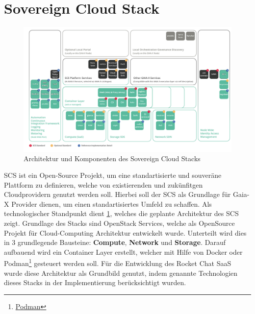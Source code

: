 \section{Sovereign Cloud Stack}
\label{sec:gaia-x:scs}

\begin{figure}[h]
  \centering
  \includegraphics[height=0.71\textwidth]{gfx/chapters/4_gaia-X/scs_architecture.png}
  \caption{Architektur und Komponenten des Sovereign Cloud Stacks}
  \label{fig:scs_architecture}
\end{figure}

\ac{SCS} ist ein Open-Source Projekt, um eine standartisierte und souveräne Plattform zu definieren, welche von 
existierenden und zukünfitgen Cloudprovidern genutzt werden soll. Hierbei soll der \ac{SCS} als Grundlage für Gaia-X Provider
dienen, um einen standartisiertes Umfeld zu schaffen.
Als technologischer Standpunkt dient \ref{fig:scs_architecture}, welches die geplante Architektur des \ac{SCS} zeigt. 
Grundlage des Stacks sind OpenStack Services, welche als OpenSource Projekt für Cloud-Computing Architektur entwickelt wurde.
Unterteilt wird dies in 3 grundlegende Bausteine: \textbf{Compute}, \textbf{Network} und \textbf{Storage}. Darauf aufbauend
wird ein Container Layer erstellt, welcher mit Hilfe von Docker oder Podman\footnote{\href{https://podman.io}{Podman}} gesteuert werden soll.
Für die Entwicklung des Rocket Chat \ac{SaaS} wurde diese Architektur als Grundbild genutzt, indem 
genannte Technologien dieses Stacks in der Implementierung berücksichtigt wurden.